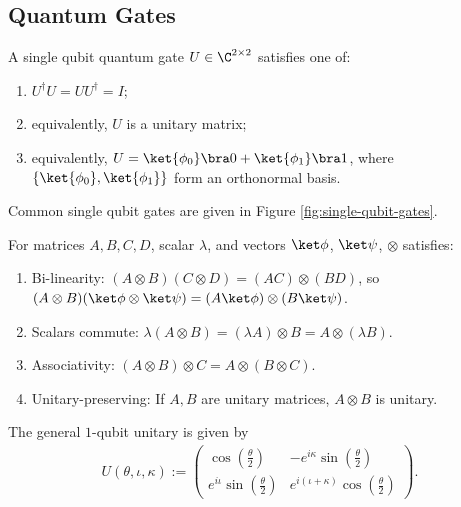 \subsection{Quantum Gates}

\begin{definition}
A single qubit quantum gate $U \in \C^{2 \times 2}$ satisfies one of:
\begin{enumerate}
    \item $U^\dagger U = UU^\dagger = I$;
    \item equivalently, $U$ is a unitary matrix;
    \item equivalently, $U = \ket{\phi_0}\bra0 + \ket{\phi_1}\bra1$, where $\{\ket{\phi_0}, \ket{\phi_1}\}$ form an orthonormal basis.
\end{enumerate}
Common single qubit gates are given in Figure \ref{fig:single-qubit-gates}.
\end{definition}



\begin{fact} 
\label{fact:tensor-properties}
For matrices $A,B,C,D$, scalar $\lambda$, and vectors $\ket\phi$, $\ket\psi$, $\otimes$ satisfies:
\begin{enumerate}
    \item Bi-linearity: $(A \otimes B)(C \otimes D) = (AC) \otimes (BD)$, so $(A \otimes B)(\ket\phi \otimes \ket\psi) = (A\ket\phi) \otimes (B\ket\psi)$.
    \item Scalars commute: $\lambda(A \otimes B) = (\lambda A) \otimes B = A \otimes (\lambda B)$.
    \item Associativity: $(A \otimes B) \otimes C = A \otimes (B \otimes C)$.
    \item Unitary-preserving: If $A,B$ are unitary matrices, $A \otimes B$ is unitary.
\end{enumerate}
\end{fact}

\begin{definition} The general $1$-qubit unitary is given by
\begin{align}
    U(\theta,\iota,\kappa)
    :=
    \begin{pmatrix}
    \cos\!\left(\frac{\theta}{2}\right)
    & - e^{i\kappa}\sin\!\left(\frac{\theta}{2}\right) \\
    e^{i\iota}\sin\!\left(\frac{\theta}{2}\right)
    & e^{i(\iota+\kappa)}\cos\!\left(\frac{\theta}{2}\right)
    \end{pmatrix}.
\end{align}
\end{definition}


